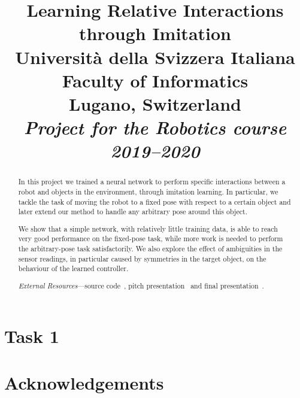 \documentclass[conference]{IEEEtran}
\begin{document}
\title{Learning Relative Interactions through Imitation \\ \vspace{0.5\baselineskip}
{
	\large {Università della Svizzera Italiana}\\
	{Faculty of Informatics} \\
	Lugano, Switzerland \\
	\textit{Project for the Robotics course 2019--2020}\\
}
}

\author{
\and
{}
}

\maketitle
\thispagestyle{plain}
\pagestyle{plain}

\begin{abstract}
In this project we trained a neural network to perform specific interactions 
between a robot and objects in the environment, through imitation learning. In 
particular, we tackle the task of moving the robot to a fixed pose with respect 
to a certain object and later extend our method to handle any arbitrary pose 
around this object.

We show that a simple network, with relatively little training data, is able to 
reach very good performance on the fixed-pose task, while more work is needed 
to perform the arbitrary-pose task satisfactorily. We also explore the effect 
of ambiguities in the sensor readings, in particular caused by symmetries in 
the target object, on the behaviour of the learned controller.

\emph{External Resources}---source code~\cite{github}, pitch 
presentation~\cite{pitch} and final presentation~\cite{final-pitch}.

\end{abstract}





\section{Task 1}








\section*{Acknowledgements}




\end{document}
